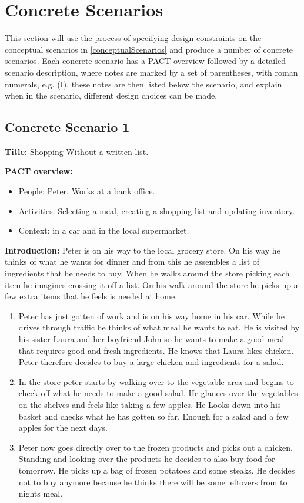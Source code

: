 \section{Concrete Scenarios}
This section will use the process of specifying design constraints on the conceptual scenarios in \cref{conceptualScenarios} and produce a number of concrete scenarios. Each concrete scenario has a PACT overview followed by a detailed scenario description, where notes are marked by a set of parentheses, with roman numerals, e.g. (I), these notes are then listed below the scenario, and explain when in the scenario, different design choices can be made.

\subsection{Concrete Scenario 1}\label{MealPlanCScenario1}

\textbf{Title:} Shopping Without a written list.

\textbf{PACT overview:}
\begin{itemize}
\item People: Peter. Works at a bank office.
\item Activities: Selecting a meal, creating a shopping list and updating inventory.  
\item Context: in a car and in the local supermarket.
\end{itemize}

\textbf{Introduction:} Peter is on his way to the local grocery store. On his way he thinks of what he wants for dinner and from this he assembles a list of ingredients that he needs to buy. When he walks around the store picking each item he imagines crossing it off a list. On his walk around the store he picks up a few extra items that he feels is needed at home.
\begin{enumerate}
\item Peter has just gotten of work and is on his way home in his car. While he drives through traffic he thinks of what meal he wants to eat. He is visited by his sister Laura and her boyfriend John so he wants to make a good meal that requires good and fresh ingredients. He knows that Laura likes chicken. Peter therefore decides to buy a large chicken and ingredients for a salad. 
\item In the store peter starts by walking over to the vegetable area and begins to check off what he needs to make a good salad. He glances over the vegetables on the shelves and feels like taking a few apples. He Looks down into his basket and checks what he has gotten so far. Enough for a salad and a few apples for the next days.
\item Peter now goes directly over to the frozen products and picks out a chicken. Standing and looking over the products he decides to also buy food for tomorrow. He picks up a bag of frozen potatoes and some steaks. He decides not to buy anymore because he thinks there will be some leftovers from to nights meal.  
\end{enumerate}

